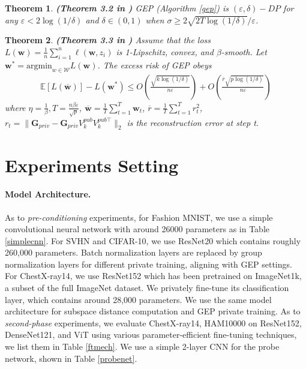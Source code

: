 \documentclass[11pt]{article}
\renewcommand{\epsilon}{\varepsilon}
\newtheorem{theorem}{Theorem}
\begin{document}
\begin{theorem}
    \textbf{(Theorem 3.2 in \cite{donot})}
    GEP (Algorithm \ref{gep}) is $(\epsilon, \delta)-DP$ for any $\epsilon < 2\log(1/\delta)$ and $\delta \in (0,1)$ when $\sigma \geq 2\sqrt{2T\log(1/\delta)}/\epsilon$.
\end{theorem}



\begin{theorem}
    \textbf{(Theorem 3.3 in \cite{donot})} 
    Assume that the loss $L(\mathbf{w}) = \frac{1}{n} \sum_{i=1}^n \ell\left(\mathbf{w}, z_i\right)$ is 1-Lipschitz, convex, and $\beta$-smooth. Let $\mathbf{w}^* = \mathrm{argmin}_{w \in \mathcal{W}} L(\mathbf{w})$. The excess risk of GEP obeys
    \begin{equation}
    \begin{aligned}
        \mathbb{E}[L(\overline{\boldsymbol{\mathbf{w}}})]-L\left(\boldsymbol{\mathbf{w}}^*\right) \le O\left(\frac{\sqrt{k\log(1/\delta)}}{n\epsilon}\right) + O\left(\frac{\overline{r}\sqrt{p\log(1/\delta)}}{n\epsilon}\right)
    \end{aligned}
    \end{equation}
    where $\eta=\frac{1}{\beta}, T=\frac{n \beta \epsilon}{\sqrt{p}}$, $\overline{\boldsymbol{\mathbf{w}}} = \frac{1}{T}\sum_{t=1}^{T}\mathbf{w}_t$, $\overline{r} = \frac{1}{T}\sum_{t=1}^{T}r^2_t$, $r_t = \|\mathbf{G}_{p r i v}-\mathbf{G}_{p r i v} V_k^{p u b} V_k^{p u b \top}\|_2$ is the reconstruction error at step t.
\end{theorem}
\section{Experiments Setting}
\label{appexp}

\paragraph{Model Architecture.} As to \textit{pre-conditioning} experiments, for Fashion MNIST, we use a simple convolutional neural network with around 26000 parameters as in Table \ref{simplecnn}. For SVHN and CIFAR-10, we use ResNet20 which contains roughly 260,000 parameters. Batch normalization layers are replaced by group normalization layers for different private training, aligning with GEP settings. For ChestX-ray14, we use ResNet152 which has been pretrained on ImageNet1k, a subset of the full ImageNet \cite{imagenet} dataset. We privately fine-tune its classification layer, which contains around 28,000 parameters. We use the same model architecture for subspace distance computation and GEP private training. As to \textit{second-phase} experiments, we evaluate ChestX-ray14, HAM10000 on ResNet152, DenseNet121, and ViT using various parameter-efficient fine-tuning techniques, we list them in Table \ref{ftmech}. We use a simple 2-layer CNN for the probe network, shown in Table \ref{probenet}. 
\end{document}
